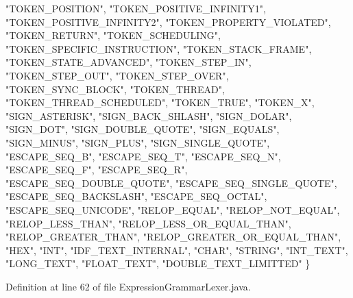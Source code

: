 \begin{DoxyCode}
    \textcolor{stringliteral}{"TOKEN\_POSITION"}, \textcolor{stringliteral}{"TOKEN\_POSITIVE\_INFINITY1"}, \textcolor{stringliteral}{"TOKEN\_POSITIVE\_INFINITY2"}, 
    \textcolor{stringliteral}{"TOKEN\_PROPERTY\_VIOLATED"}, \textcolor{stringliteral}{"TOKEN\_RETURN"}, \textcolor{stringliteral}{"TOKEN\_SCHEDULING"}, \textcolor{stringliteral}{"TOKEN\_SPECIFIC\_INSTRUCTION"}, 
    \textcolor{stringliteral}{"TOKEN\_STACK\_FRAME"}, \textcolor{stringliteral}{"TOKEN\_STATE\_ADVANCED"}, \textcolor{stringliteral}{"TOKEN\_STEP\_IN"}, \textcolor{stringliteral}{"TOKEN\_STEP\_OUT"}, 
    \textcolor{stringliteral}{"TOKEN\_STEP\_OVER"}, \textcolor{stringliteral}{"TOKEN\_SYNC\_BLOCK"}, \textcolor{stringliteral}{"TOKEN\_THREAD"}, \textcolor{stringliteral}{"TOKEN\_THREAD\_SCHEDULED"}, 
    \textcolor{stringliteral}{"TOKEN\_TRUE"}, \textcolor{stringliteral}{"TOKEN\_X"}, \textcolor{stringliteral}{"SIGN\_ASTERISK"}, \textcolor{stringliteral}{"SIGN\_BACK\_SHLASH"}, \textcolor{stringliteral}{"SIGN\_DOLAR"}, 
    \textcolor{stringliteral}{"SIGN\_DOT"}, \textcolor{stringliteral}{"SIGN\_DOUBLE\_QUOTE"}, \textcolor{stringliteral}{"SIGN\_EQUALS"}, \textcolor{stringliteral}{"SIGN\_MINUS"}, \textcolor{stringliteral}{"SIGN\_PLUS"}, 
    \textcolor{stringliteral}{"SIGN\_SINGLE\_QUOTE"}, \textcolor{stringliteral}{"ESCAPE\_SEQ\_B"}, \textcolor{stringliteral}{"ESCAPE\_SEQ\_T"}, \textcolor{stringliteral}{"ESCAPE\_SEQ\_N"}, \textcolor{stringliteral}{"ESCAPE\_SEQ\_F"}, 
    \textcolor{stringliteral}{"ESCAPE\_SEQ\_R"}, \textcolor{stringliteral}{"ESCAPE\_SEQ\_DOUBLE\_QUOTE"}, \textcolor{stringliteral}{"ESCAPE\_SEQ\_SINGLE\_QUOTE"}, 
    \textcolor{stringliteral}{"ESCAPE\_SEQ\_BACKSLASH"}, \textcolor{stringliteral}{"ESCAPE\_SEQ\_OCTAL"}, \textcolor{stringliteral}{"ESCAPE\_SEQ\_UNICODE"}, \textcolor{stringliteral}{"RELOP\_EQUAL"}, 
    \textcolor{stringliteral}{"RELOP\_NOT\_EQUAL"}, \textcolor{stringliteral}{"RELOP\_LESS\_THAN"}, \textcolor{stringliteral}{"RELOP\_LESS\_OR\_EQUAL\_THAN"}, \textcolor{stringliteral}{"RELOP\_GREATER\_THAN"}, 
    \textcolor{stringliteral}{"RELOP\_GREATER\_OR\_EQUAL\_THAN"}, \textcolor{stringliteral}{"HEX"}, \textcolor{stringliteral}{"INT"}, \textcolor{stringliteral}{"IDF\_TEXT\_INTERNAL"}, \textcolor{stringliteral}{"CHAR"}, 
    \textcolor{stringliteral}{"STRING"}, \textcolor{stringliteral}{"INT\_TEXT"}, \textcolor{stringliteral}{"LONG\_TEXT"}, \textcolor{stringliteral}{"FLOAT\_TEXT"}, \textcolor{stringliteral}{"DOUBLE\_TEXT\_LIMITTED"}
  \}
\end{DoxyCode}


Definition at line 62 of file Expression\+Grammar\+Lexer.\+java.

